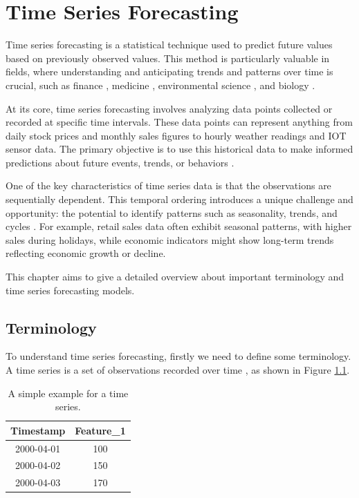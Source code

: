 \chapter{Time Series Forecasting}
\label{ch:forecasting}

Time series forecasting is a statistical technique used to predict future values based on previously observed values. This method is particularly valuable in  fields, where understanding and anticipating trends and patterns over time is crucial, such as finance \parencite{andersen2005volatility}, medicine \parencite{topol2019high}, environmental science \parencite{mudelsee2019trend}, and biology \parencite{stoffer2012special}.

At its core, time series forecasting involves analyzing data points collected or recorded at specific time intervals. These data points can represent anything from daily stock prices and monthly sales figures to hourly weather readings and \ac{IOT} sensor data. The primary objective is to use this historical data to make informed predictions about future events, trends, or behaviors \parencite[ch. 1]{zhang2001investigation}.

One of the key characteristics of time series data is that the observations are sequentially dependent. This temporal ordering introduces a unique challenge and opportunity: the potential to identify patterns such as seasonality, trends, and cycles \parencite{assfalg2009periodic}. For example, retail sales data often exhibit seasonal patterns, with higher sales during holidays, while economic indicators might show long-term trends reflecting economic growth or decline.

This chapter aims to give a detailed overview about important terminology and time series forecasting models.

\section{Terminology}
To understand time series forecasting, firstly we need to define some terminology. A time series is a set of observations recorded over time \parencite{haben2023time}, as shown in Figure \ref{tab:time_series_example}. 


\begin{table}[h]
    \centering
    \begin{tabular}{|c|c|}
        \hline
         \textbf{Timestamp}& \textbf{Feature\_1}\\
         \hline
         2000-04-01& 100\\
         \hline
         2000-04-02& 150\\
         \hline
         2000-04-03& 170\\
         \hline
    \end{tabular}
    \caption{A simple example for a time series.}
    \label{tab:time_series_example}
\end{table}

